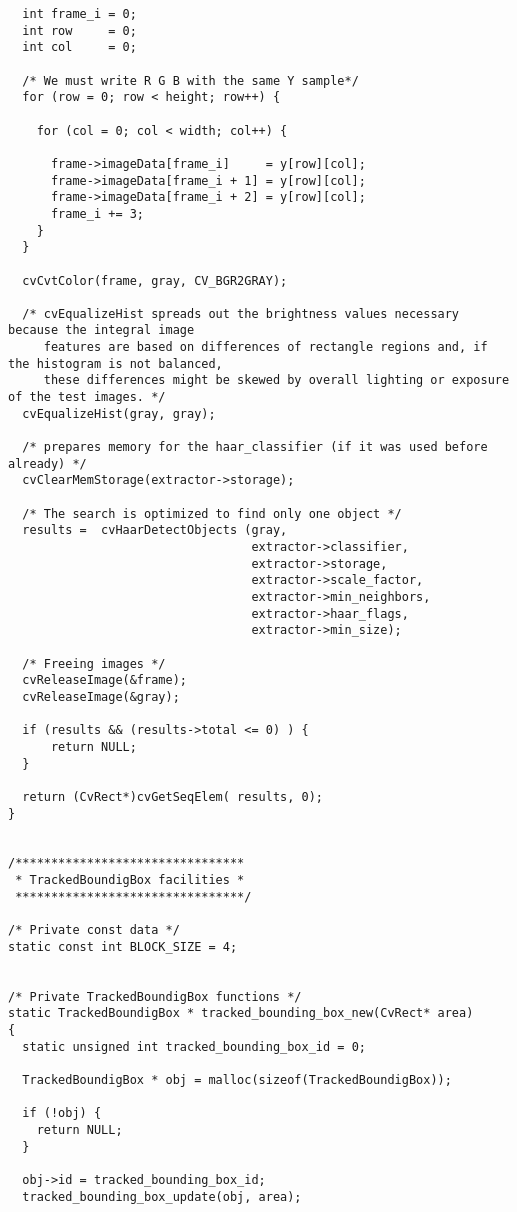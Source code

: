 \begin{lstlisting}
  int frame_i = 0;
  int row     = 0;
  int col     = 0;

  /* We must write R G B with the same Y sample*/
  for (row = 0; row < height; row++) {

    for (col = 0; col < width; col++) {

      frame->imageData[frame_i]     = y[row][col];
      frame->imageData[frame_i + 1] = y[row][col];
      frame->imageData[frame_i + 2] = y[row][col];
      frame_i += 3;
    }
  }

  cvCvtColor(frame, gray, CV_BGR2GRAY);

  /* cvEqualizeHist spreads out the brightness values necessary because the integral image 
     features are based on differences of rectangle regions and, if the histogram is not balanced, 
     these differences might be skewed by overall lighting or exposure of the test images. */
  cvEqualizeHist(gray, gray);

  /* prepares memory for the haar_classifier (if it was used before already) */
  cvClearMemStorage(extractor->storage);

  /* The search is optimized to find only one object */
  results =  cvHaarDetectObjects (gray,
                                  extractor->classifier,
                                  extractor->storage,
                                  extractor->scale_factor,
                                  extractor->min_neighbors,
                                  extractor->haar_flags, 
                                  extractor->min_size);

  /* Freeing images */
  cvReleaseImage(&frame);
  cvReleaseImage(&gray);

  if (results && (results->total <= 0) ) {
      return NULL;
  }

  return (CvRect*)cvGetSeqElem( results, 0);
}


/******************************** 
 * TrackedBoundigBox facilities * 
 ********************************/

/* Private const data */
static const int BLOCK_SIZE = 4;


/* Private TrackedBoundigBox functions */
static TrackedBoundigBox * tracked_bounding_box_new(CvRect* area)
{
  static unsigned int tracked_bounding_box_id = 0;

  TrackedBoundigBox * obj = malloc(sizeof(TrackedBoundigBox));

  if (!obj) {
    return NULL;
  }

  obj->id = tracked_bounding_box_id;
  tracked_bounding_box_update(obj, area);


\end{lstlisting}
